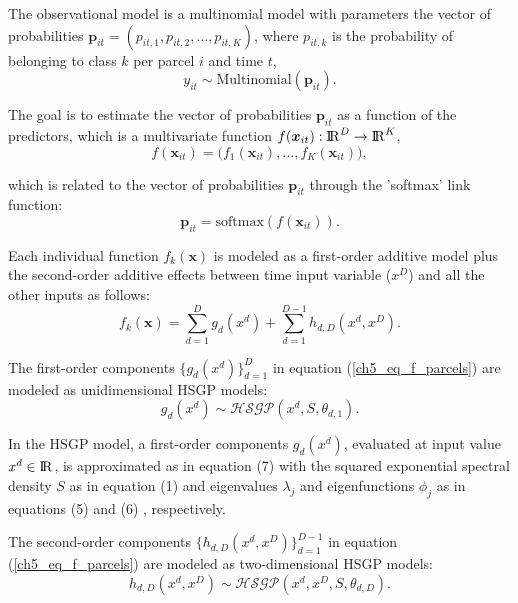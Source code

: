 \documentclass[onecolumn,a4paper,11pt]{article}
\begin{document}
The observational model is a multinomial model with parameters the vector of probabilities $\bm{p}_{it}=(p_{it,1},p_{it,2},\dots,p_{it,K})$, where $p_{it,k}$ is the probability of belonging to class $k$ per parcel $i$ and time $t$,
%
\begin{equation*}
y_{it} \sim \mathrm{Multinomial}(\bm{p}_{it}).
\end{equation*}

\noindent The goal is to estimate the vector of probabilities $\bm{p}_{it}$ as a function of the predictors, which is a multivariate function $f(\bm{x}_{it}):{\rm I\!R}^{D} \rightarrow {\rm I\!R}^{K}$,
$$
f(\bm{x}_{it})=\big(f_1(\bm{x}_{it}),\dots,f_K(\bm{x}_{it}) \big),
$$

\noindent which is related to the vector of probabilities $\bm{p}_{it}$ through the 'softmax' link function:
%
\begin{equation*}
\bm{p}_{it} = \mathrm{softmax}(f(\bm{x}_{it})).
\end{equation*}

Each individual function $f_k(\bm{x})$ is modeled as a first-order additive model plus the second-order additive effects between time input variable ($x^D$) and all the other inputs as follows: 
%
\begin{equation} \label{ch5_eq_f_parcels}
f_k(\bm{x}) = \sum_{d=1}^{D} g_d(x^d) + \sum_{d=1}^{D-1} h_{d,D}(x^d,x^D).
\end{equation}

\noindent The first-order components $\{g_d(x^d)\}_{d=1}^D$ in equation (\ref{ch5_eq_f_parcels}) are modeled as unidimensional HSGP models:
%
\begin{equation*}
g_d(x^d) \sim \mathcal{HSGP}(x^d, S, \theta_{d,1}).
\end{equation*}

\noindent In the HSGP model, a first-order components $g_d(x^d)$, evaluated at input value $x^d \in {\rm I\!R}$, is approximated as in equation (7) %
with the squared exponential spectral density $S$ as in equation (1) %
 and eigenvalues $\lambda_j$  and eigenfunctions $\phi_j$ as in equations (5) %
and (6)%
  , respectively. 

The second-order components $\{h_{d,D}(x^d,x^D)\}_{d=1}^{D-1}$ in equation (\ref{ch5_eq_f_parcels}) are modeled as two-dimensional HSGP models:
%
\begin{equation*}
h_{d,D}(x^d,x^D) \sim \mathcal{HSGP}(x^d,x^D, S, \theta_{d,D}).
\end{equation*} 
\end{document}
